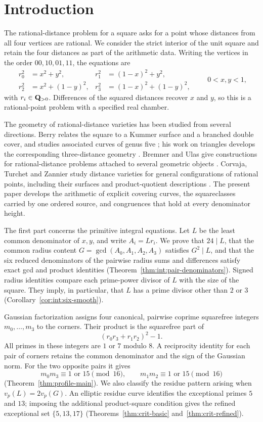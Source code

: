 \section{Introduction}
\label{sec:introduction}

The rational-distance problem for a square asks for a point whose distances
from all four vertices are rational. We consider the strict interior of the
unit square and retain the four distances as part of the arithmetic data.
Writing the vertices in the order $00,10,01,11$, the equations are
\[
 \begin{aligned}
 r_0^2&=x^2+y^2,&r_1^2&=(1-x)^2+y^2,\\
 r_2^2&=x^2+(1-y)^2,&r_3^2&=(1-x)^2+(1-y)^2,
 \end{aligned}
 \qquad 0<x,y<1,
\]
with $r_i\in\mathbf Q_{>0}$. Differences of the squared distances recover $x$
and $y$, so this is a rational-point problem with a specified real chamber.

The geometry of rational-distance varieties has been studied from several
directions. Berry relates the square to a Kummer surface and a branched
double cover, and studies associated curves of genus five
\cite{berry1990}; his work on triangles develops the corresponding
three-distance geometry \cite{berry1992}. Bremner and Ulas give
constructions for rational-distance problems attached to several geometric
objects \cite{bremnerulas2016}. Corvaja, Turchet and Zannier study distance
varieties for general configurations of rational points, including their
surfaces and product-quotient descriptions
\cite{corvajaturchetzannier2025}. The present paper develops the arithmetic
of explicit covering curves, the squareclasses carried by one ordered
source, and congruences that hold at every denominator height.

The first part concerns the primitive integral equations. Let $L$ be the
least common denominator of $x,y$, and write $A_i=Lr_i$. We prove that
$24\mid L$, that the common radius content $G=\gcd(A_0,A_1,A_2,A_3)$
satisfies $G^2\mid L$, and that the six reduced denominators of the pairwise
radius sums and differences satisfy exact gcd and product identities
(Theorem~\ref{thm:int:pair-denominators}). Signed radius identities compare
each prime-power divisor of $L$ with the size of the square. They imply,
in particular, that $L$ has a prime divisor other than $2$ or $3$
(Corollary~\ref{cor:int:six-smooth}).

Gaussian factorization assigns four canonical, pairwise coprime
squarefree integers $m_0,\ldots,m_3$ to the corners. Their product is
the squarefree part of
\[
 (r_0r_3+r_1r_2)^2-1.
\]
All primes in these integers are $1$ or $7$ modulo $8$. A reciprocity
identity for each pair of corners retains the common denominator and the
sign of the Gaussian norm. For the two opposite pairs it gives
\[
 m_0m_3\equiv1\text{ or }15\pmod{16},\qquad
 m_1m_2\equiv1\text{ or }15\pmod{16}
\]
(Theorem~\ref{thm:profile-main}). We also classify the residue pattern
arising when $v_p(L)=2v_p(G)$. An elliptic residue curve identifies the
exceptional primes $5$ and $13$; imposing the additional product-square
condition gives the refined exceptional set $\{5,13,17\}$
(Theorems~\ref{thm:crit-basic} and~\ref{thm:crit-refined}).

